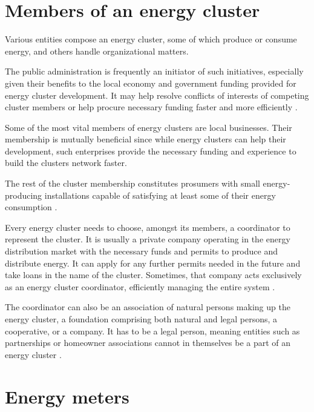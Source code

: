 \section {Members of an energy cluster}

\par Various entities compose an energy cluster, some of which produce or consume energy, and others handle organizational matters. 
\par The public administration is frequently an initiator of such initiatives, especially given their benefits to the local economy and government funding provided for energy cluster development. It may help resolve conflicts of interests of competing cluster members or help procure necessary funding faster and more efficiently \citep {ksiazka}.
\par Some of the most vital members of energy clusters are local businesses. Their membership is mutually beneficial since while energy clusters can help their development, such enterprises provide the necessary funding and experience to build the clusters network faster.
\par The rest of the cluster membership constitutes prosumers with small energy-producing installations capable of satisfying at least some of their energy consumption \citep{erKlaster}.
\par Every energy cluster needs to choose, amongst its members, a coordinator to represent the cluster. It is usually a private company operating in the energy distribution market with the necessary funds and permits to produce and distribute energy. It can apply for any further permits needed in the future and take loans in the name of the cluster. Sometimes, that company acts exclusively as an energy cluster coordinator, efficiently managing the entire system \citep{erKlaster}.
\par The coordinator can also be an association of natural persons making up the energy cluster, a foundation comprising both natural and legal persons, a cooperative, or a company. It has to be a legal person, meaning entities such as partnerships or homeowner associations cannot in themselves be a part of an energy cluster \citep{erKlaster}.

\section{Energy meters}

